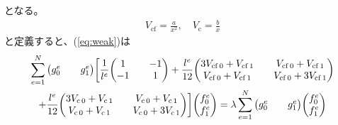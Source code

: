 \documentclass[xelatex,ja=standard]{bxjsarticle}
\begin{document}
となる。
\begin{align}
    V_\mathrm{cf} = \frac{a}{x^2},\quad V_\mathrm{c} = \frac{b}{x}
\end{align}
と定義すると、(\ref{eq:weak})は
\begin{multline}
    \sum_{e=1}^N \mqty(g^e_0 && g^e_1)\bigg[\frac{1}{l^e}\mqty(1 && -1 \\ -1 && 1)
     + \frac{l^e}{12}\mqty(3V_{\mathrm{cf}\,0} +V_{\mathrm{cf}\, 1} && V_{\mathrm{cf}\, 0} +V_{\mathrm{cf}\, 1}\\ V_{\mathrm{cf}\, 0} +V_{\mathrm{cf}\, 1}&&V_{\mathrm{cf}\, 0} +3V_{\mathrm{cf}\, 1})\\
     + \frac{l^e}{12}\mqty(3V_{\mathrm{c}\,0} +V_{\mathrm{c}\, 1} && V_{\mathrm{c}\, 0} +V_{\mathrm{c}\, 1}\\ V_{\mathrm{c}\, 0} +V_{\mathrm{c}\, 1}&&V_{\mathrm{c}\, 0} +3V_{\mathrm{c}\, 1})\bigg]\mqty(f^e_0 \\ f^e_1)=\lambda\sum_{e=1}^N \mqty(g^e_0 && g^e_1)\mqty(f^e_0 \\ f^e_1)
\end{multline}
\end{document}
